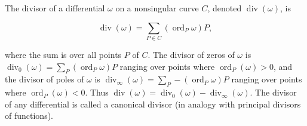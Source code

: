 The divisor of a differential $\omega$ on a nonsingular curve $C$, denoted $\operatorname{div}(\omega)$, is

$$\operatorname{div}(\omega) = \sum_{P \in C} (\operatorname{ord}_P \omega) P,$$

where the sum is over all points $P$ of $C$. The divisor of zeros of $\omega$ is $\operatorname{div}_0(\omega) = \sum_{P} (\operatorname{ord}_P \omega) P$ ranging over points where $\operatorname{ord}_P(\omega) > 0$, and the divisor of poles of $\omega$ is $\operatorname{div}_\infty(\omega) = \sum_{P} -(\operatorname{ord}_P \omega) P$ ranging over points where $\operatorname{ord}_P(\omega) < 0$. Thus $\operatorname{div}(\omega) = \operatorname{div}_0(\omega) - \operatorname{div}_\infty(\omega)$. The divisor of any differential is called a canonical divisor (in analogy with principal divisors of functions).
